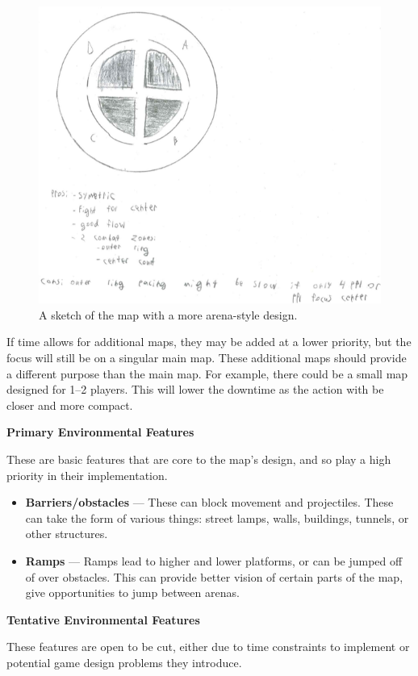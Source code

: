 \documentclass{article}
\theoremstyle{definition}
\begin{document}
\begin{figure}[htpb]
  \centering
  \includegraphics[width=0.8\linewidth]{austin_map2.png}
  \caption{A sketch of the map with a more arena-style design.}
\label{fig:austin_map1}
\end{figure}

If time allows for additional maps, they may be added at a lower priority, but
the focus will still be on a singular main map. These additional maps should
provide a different purpose than the main map. For example, there could be
a small map designed for 1--2 players. This will lower the downtime as the
action with be closer and more compact.

\textbf{Primary Environmental Features}

These are basic features that are core to the map's design, and so play a high
priority  in their implementation.

\begin{itemize}
  \item \textbf{Barriers/obstacles} --- These can block movement and
    projectiles. These can take the form of various things: street lamps,
    walls, buildings, tunnels, or other structures.
  \item \textbf{Ramps} --- Ramps lead to higher and lower platforms, or can be jumped
    off of over obstacles. This can provide better vision of certain parts of
    the map, give opportunities to jump between arenas.
\end{itemize}

\textbf{Tentative Environmental Features}

These features are open to be cut, either due to time constraints to implement
or potential game design problems they introduce.
\end{document}
